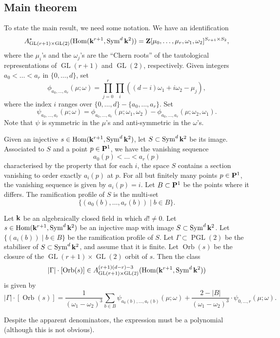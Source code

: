 \documentclass[11pt]{amsart}
\renewcommand {\P}{{\bf P}}
\providecommand{\GL}{\operatorname{GL}}
\providecommand{\PGL}{\operatorname{PGL}}
\providecommand{\Hom}{\operatorname{Hom}}
\providecommand{\Sym}{\operatorname{Sym}}
\DeclareMathOperator{\Orb}{Orb}
\begin{document}
\subsection{Main theorem}
To state the main result, we need some notation.
We have an identification
\begin{equation}\label{eq:A}
  A^{*}_{\GL(r+1) \times \GL(2)}(\Hom(\k^{r+1}, \Sym^d \k^2))= \mathbf{Z}[\mu_{0},\dots,\mu_{r}, \omega_{1}, \omega_2]^{S_{r+1} \times S_{2}},
\end{equation}
where the \(\mu_{i}\)'s and the \(\omega_{j}\)'s are the ``Chern roots'' of the tautological representations of \(\GL(r+1)\) and \(\GL(2)\), respectively.
Given integers \(a_{0}< \dots < a_{r}\) in \(\{0,\dots,d\}\), set 
\[ \phi_{a_0, \dots, a_r}(\mu;\omega) = \prod_{j = 0}^r\prod_{i}((d-i) \omega_1 + i \omega_2-\mu_{j}),\]
where the index \(i\) ranges over \(\{0,\dots,d\} - \{a_0, \dots, a_r\}\).
Set
\[ \psi_{a_0,\dots,a_r}(\mu;\omega) = \phi_{a_0, \dots, a_r}(\mu;\omega_1,\omega_2) - \phi_{a_0, \dots, a_r}(\mu;\omega_2,\omega_1).\]
Note that \(\psi\) is symmetric in the \(\mu\)'s and anti-symmetric in the \(\omega\)'s.

Given an injective \(s \in \Hom(\k^{r+1}, \Sym^d \k^2)\), let \(S \subset \Sym^{d}\k^2\) be its image.
Associated to \(S\) and a point \(p \in \P^{1}\), we have the vanishing sequence
\[a_{0}(p) < \dots < a_{r}(p)\]
characterised by the property that for each \(i\), the space \(S\) contains a section vanishing to order exactly \(a_{i}(p)\) at \(p\).
For all but finitely many points \(p \in \P^{1}\), the vanishing sequence is given by \(a_{i}(p) = i\).
Let \(B \subset \P^{1}\) be the points where it differs.
The ramification profile of \(S\) is the multi-set
\[\{(a_0(b), \dots, a_{r}(b)) \mid b \in B\}.\]
\begin{theorem}\label{thm:main}
  Let \(\mathbf k\) be an algebraically closed field in which \(d! \neq 0\).
  Let \(s \in \Hom(\k^{r+1}, \Sym^d  \k^2)\) be an injective map with image \(S \subset \Sym^d\k^2\).
  Let \(\{(a_{i}(b)) \mid b \in B\}\) be the ramification profile of \(S\).
  Let \(\Gamma \subset  \PGL(2)\) be the stabiliser of \(S \subset \Sym^d\k^2\), and assume that it is finite.
  Let \(\Orb(s)\) be the closure of the \(\GL(r+1) \times \GL(2)\) orbit of \(s\).
  Then the class
  \[ |\Gamma| \cdot [\Orb(s)] \in A^{(r+1)(d-r)-3}_{\GL(r+1) \times \GL(2)}(\Hom(\k^{r+1}, \Sym^d \k^2)) \]
  is given by
  \[|\Gamma| \cdot [\Orb(s)] = \frac{1}{(\omega_1-\omega_2)^3}\sum_{b \in B}   \psi_{a_0(b), \dots, a_r(b)}(\mu;\omega) + \frac{2-|B|}{(\omega_1-\omega_2)^3} \cdot \psi_{0,\dots,r}(\mu;\omega).\]
\end{theorem}
Despite the apparent denominators, the expression must be a polynomial (although this is not obvious).
\end{document}
